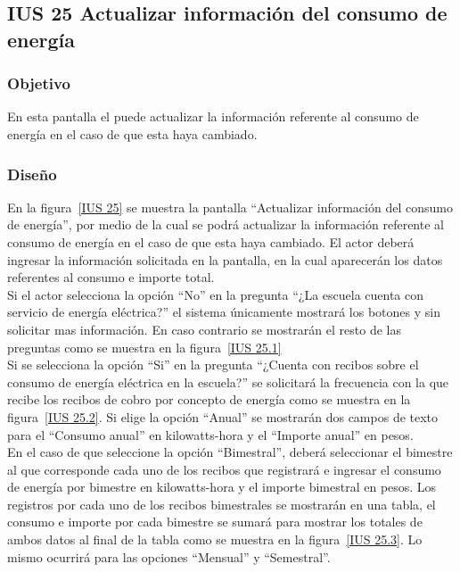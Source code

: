 \subsection{IUS 25 Actualizar información del consumo de energía}

\subsubsection{Objetivo}

      En esta pantalla el  puede actualizar la información referente al consumo de energía en el caso de que esta haya cambiado.

\subsubsection{Diseño}

    En la figura~\ref{IUS 25} se muestra la pantalla ``Actualizar información del consumo de energía'', por medio de la cual se podrá actualizar la información referente al consumo de energía en el caso de que esta haya cambiado. El actor deberá ingresar la información solicitada en la pantalla, en la cual aparecerán los datos referentes al consumo e importe total.\\
    
    Si el actor selecciona la opción ``No'' en la pregunta ``¿La escuela cuenta con servicio de energía eléctrica?'' el sistema únicamente mostrará los botones  y  sin solicitar mas información. En caso contrario se mostrarán el resto de las preguntas como se muestra en la figura~\ref{IUS 25.1}\\
        
    Si se selecciona la opción ``Si'' en la pregunta ``¿Cuenta con recibos sobre el consumo de energía eléctrica en la escuela?'' se solicitará la frecuencia con la que recibe los recibos de cobro por concepto de energía como se muestra en la figura~\ref{IUS 25.2}. Si elige la opción ``Anual'' se mostrarán dos campos de texto para el ``Consumo anual'' en kilowatts-hora y el ``Importe anual'' en pesos.\\
    
    En el caso de que seleccione la opción ``Bimestral'', deberá seleccionar el bimestre al que corresponde cada uno de los recibos que registrará e ingresar el consumo de energía por bimestre en kilowatts-hora y el importe bimestral en pesos. Los registros por cada uno de los recibos bimestrales se mostrarán en una tabla, el consumo e importe por cada bimestre se sumará para mostrar los totales de ambos datos al final de la tabla como se muestra en la figura~\ref{IUS 25.3}. Lo mismo ocurrirá para las opciones ``Mensual'' y ``Semestral''. \\
    
